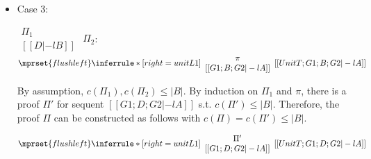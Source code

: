 \begin{itemize}
\item Case 3:
      \begin{center}
        \scriptsize
        \begin{math}
          \begin{array}{c}
            \Pi_1 \\
            {[[D |-l B]]}
          \end{array}
        \end{math}
        \qquad\qquad
        $\Pi_2$:
        \begin{math}
          $$\mprset{flushleft}
          \inferrule* [right={\tiny unitL1}] {
            {
              \begin{array}{c}
                \pi \\
                {[[G1; B; G2 |-l A]]}
              \end{array}
            }
          }{[[UnitT; G1; B; G2 |-l A]]}
        \end{math}
      \end{center}
      By assumption, $c(\Pi_1),c(\Pi_2)\leq |B|$. By induction on $\Pi_1$
      and $\pi$, there is a proof $\Pi'$ for sequent $[[G1; D; G2 |-l A]]$
      s.t. $c(\Pi') \leq |B|$. Therefore, the proof $\Pi$ can be
      constructed as follows with $c(\Pi) = c(\Pi') \leq |B|$.
      \begin{center}
        \scriptsize
        \begin{math}
          $$\mprset{flushleft}
          \inferrule* [right={\tiny unitL1}] {
            {
              \begin{array}{c}
                \Pi' \\
                {[[G1; D; G2 |-l A]]}
              \end{array}
            }
          }{[[UnitT; G1; D; G2 |-l A]]}
        \end{math}
      \end{center}
\end{itemize}


